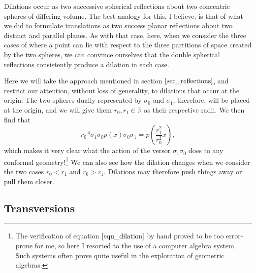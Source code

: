 \documentclass[12pt]{article}
\newcommand{\R}{\mathbb{R}}
\begin{document}
Dilations occur as two successive spherical reflections about two concentric
spheres of differing volume.  The best analogy for this, I believe, is that of what we did to formulate
translations as two success planar reflections about two distinct and parallel planes.
As with that case, here, when we consider the three cases of where a point can lie
with respect to the three partitions of space created by the two spheres, we can convince ourselves
that the double spherical reflections consistently produce a dilation in each case.

Here we will take the approach mentioned in section $\eqref{sec_reflections}$,
and restrict our attention, without loss of generality, to dilations that occur at the
origin.  The two spheres dually represented by $\sigma_0$ and $\sigma_1$, therefore,
will be placed at the origin, and we will give them $r_0,r_1\in\R$ as their respective radii.
We then find that
\begin{equation}\label{equ_dilation}
r_0^{-4}\sigma_1\sigma_0 p(x)\sigma_0\sigma_1 = p\left(\frac{r_1^2}{r_0^2}x\right),
\end{equation}
which makes it very clear what the action of the versor $\sigma_1\sigma_0$ does
to any conformal geometry!\footnote{The verification of equation $\eqref{equ_dilation}$
by hand proved to be too error-prone for me, so here I resorted to the use of a computer
algebra system.  Such systems often prove quite useful in the exploration of geometric algebras.}
We can also see how the dilation changes when
we consider the two cases $r_0<r_1$ and $r_0>r_1$.  Dilations may therefore
push things away or pull them closer.

\subsection{Transversions}

\end{document}
